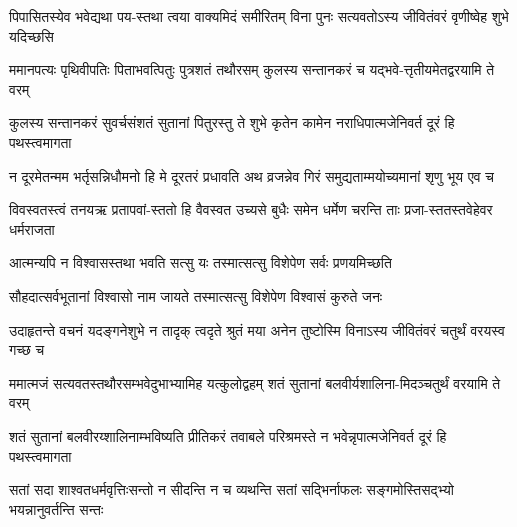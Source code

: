 


\twolineshloka
{पिपासितस्येव भवेद्यथा पय-स्तथा त्वया वाक्यमिदं समीरितम्}
{विना पुनः सत्यवतोऽस्य जीवितंवरं वृणीष्वेह शुभे यदिच्छसि}




\twolineshloka
{ममानपत्यः पृथिवीपतिः पिताभवत्पितुः पुत्रशतं तथौरसम्}
{कुलस्य सन्तानकरं च यद्भवे-त्तृतीयमेतद्वरयामि ते वरम्}




\twolineshloka
{कुलस्य सन्तानकरं सुवर्चसंशतं सुतानां पितुरस्तु ते शुभे}
{कृतेन कामेन नराधिपात्मजेनिवर्त दूरं हि पथस्त्वमागता}




\twolineshloka
{न दूरमेतन्मम भर्तृसन्निधौमनो हि मे दूरतरं प्रधावति}
{अथ व्रजन्नेव गिरं समुद्यताम्मयोच्यमानां शृणु भूय एव च}


\twolineshloka
{विवस्वतस्त्वं तनयऋ प्रतापवां-स्ततो हि वैवस्वत उच्यसे बुधैः}
{समेन धर्मेण चरन्ति ताः प्रजा-स्ततस्तवेहेवर धर्मराजता}


\twolineshloka
{आत्मन्यपि न विश्वासस्तथा भवति सत्सु यः}
{तस्मात्सत्सु विशेपेण सर्वः प्रणयमिच्छति}


\twolineshloka
{सौहदात्सर्वभूतानां विश्वासो नाम जायते}
{तस्मात्सत्सु विशेपेण विश्वासं कुरुते जनः}




\twolineshloka
{उदाहृतन्ते वचनं यदङ्गनेशुभे न तादृक् त्वदृते श्रुतं मया}
{अनेन तुष्टोस्मि विनाऽस्य जीवितंवरं चतुर्थं वरयस्व गच्छ च}




\twolineshloka
{ममात्मजं सत्यवतस्तथौरसम्भवेदुभाभ्यामिह यत्कुलोद्वहम्}
{शतं सुतानां बलवीर्यशालिना-मिदञ्चतुर्थं वरयामि ते वरम्}




\twolineshloka
{शतं सुतानां बलवीरय्शालिनाम्भविष्यति प्रीतिकरं तवाबले}
{परिश्रमस्ते न भवेन्नृपात्मजेनिवर्त दूरं हि पथस्त्वमागता}




\twolineshloka
{सतां सदा शाश्वतधर्मवृत्तिःसन्तो न सीदन्ति न च व्यथन्ति}
{सतां सद्भिर्नाफलः सङ्गमोस्तिसद्भ्यो भयन्नानुवर्तन्ति सन्तः}


